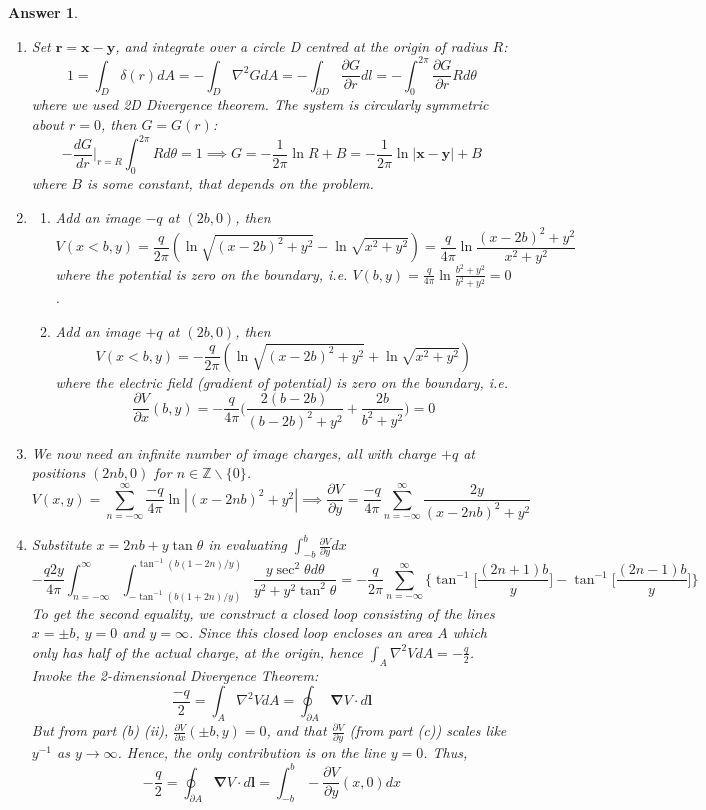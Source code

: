 \documentclass[a4paper]{article}
\newtheorem{ans}{Answer}[section]
\theoremstyle{new}
\begin{document}
\newpage
\begin{ans}\leavevmode
\begin{enumerate}[label=(\alph*)]
\item Set $\mathbf{r}=\mathbf{x}-\mathbf{y}$, and integrate over a circle D centred at the origin of radius $R$:
$$1=\int_D\delta(r)dA=-\int_D\nabla^2GdA=-\int_{\partial D}\frac{\partial G}{\partial r}dl=-\int_0^{2\pi}\frac{\partial G}{\partial r}Rd\theta$$
where we used 2D Divergence theorem. The system is circularly symmetric about $r=0$, then $G=G(r)$:
$$-\frac{dG}{dr}\bigg|_{r=R}\int_0^{2\pi}Rd\theta=1\implies G=-\frac{1}{2\pi}\ln R+B=-\frac{1}{2\pi}\ln|\mathbf{x}-\mathbf{y}|+B$$
where $B$ is some constant, that depends on the problem.
\item 
\begin{enumerate}[label=(\roman*)]
\item Add an image $-q$ at $(2b,0)$, then 
$$V(x<b,y)=\frac{q}{2\pi}(\ln\sqrt{(x-2b)^2+y^2}-\ln\sqrt{x^2+y^2})=\frac{q}{4\pi}\ln\frac{(x-2b)^2+y^2}{x^2+y^2}$$
where the potential is zero on the boundary, i.e. 
$V(b,y)=\frac{q}{4\pi}\ln\frac{b^2+y^2}{b^2+y^2}=0$.
\item Add an image $+q$ at $(2b,0)$, then
$$V(x<b,y)=-\frac{q}{2\pi}(\ln\sqrt{(x-2b)^2+y^2}+\ln\sqrt{x^2+y^2})$$
where the electric field (gradient of potential) is zero on the boundary, i.e.
$$\frac{\partial V}{\partial x}(b,y)=-\frac{q}{4\pi}\bigg(\frac{2(b-2b)}{(b-2b)^2+y^2}+\frac{2b}{b^2+y^2}\bigg)=0$$
\end{enumerate}
\item We now need an infinite number of image charges, all with charge $+q$ at positions $(2nb,0)$ for $n\in\mathbb{Z}\backslash\{0\}$.
$$V(x,y)=\sum_{n=-\infty}^\infty\frac{-q}{4\pi}\ln|(x-2nb)^2+y^2|\implies\frac{\partial V}{\partial y}=\frac{-q}{4\pi}\sum_{n=-\infty}^\infty\frac{2y}{(x-2nb)^2+y^2}$$
\item Substitute $x=2nb+y\tan\theta$ in evaluating $\int_{-b}^b\frac{\partial V}{\partial y}dx$
$$-\frac{q2y}{4\pi}\int_{n=-\infty}^\infty\int_{-\tan^{-1}(b(1+2n)/y)}^{\tan^{-1}(b(1-2n)/y)}\frac{y\sec^2\theta d\theta}{y^2+y^2\tan^2\theta}=-\frac{q}{2\pi}\sum_{n=-\infty}^{\infty}\bigg\{\tan^{-1}\bigg[\frac{(2n+1)b}{y}\bigg]-\tan^{-1}\bigg[\frac{(2n-1)b}{y}\bigg]\bigg\}$$
To get the second equality, we construct a closed loop consisting of the lines $x=\pm b$, $y=0$ and $y=\infty$. Since this closed loop encloses an area $A$ which only has half of the actual charge, at the origin, hence $\int_A\nabla^2VdA=-\frac{q}{2}$. Invoke the 2-dimensional Divergence Theorem:
$$\frac{-q}{2}=\int_A\nabla^2VdA=\oint_{\partial A}\boldsymbol{\nabla}V\cdot d\mathbf{l}$$
But from part (b) (ii), $\frac{\partial V}{\partial x}(\pm b,y)=0$, and that $\frac{\partial V}{\partial y}$ (from part (c)) scales like $y^{-1}$ as $y\rightarrow \infty$. Hence, the only contribution is on the line $y=0$. Thus,
$$-\frac{q}{2}=\oint_{\partial A}\boldsymbol{\nabla}V\cdot d\mathbf{l}=\int_{-b}^b-\frac{\partial V}{\partial y}(x,0)dx$$
\end{enumerate}
\end{ans}
\end{document}
